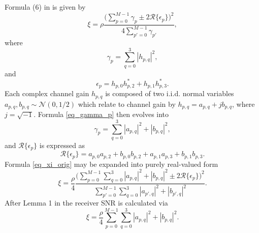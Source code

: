 \documentclass{article}
\begin{document}
Formula (6) in \cite{b_FullRate_STLC} is given by
\begin{equation} \label{eq_xi_orig}
    \xi = \rho \frac{\Big( \sum_{p=0}^{M-1} \gamma_{p} \pm 2\mathcal{R}\big\{ \epsilon_p\big\} \Big)^2}{4\sum_{p'=0}^{M-1}\gamma_{p'}},
\end{equation}
where 
\begin{equation} \label{eq_gamma_p}
    \gamma_p = \sum_{q=0}^{3} |h_{p,q}|^2,
\end{equation}
and
\begin{equation} \label{eq_epsilon_p}
    \epsilon_p = h_{p,0}h_{p,2}^* + h_{p,1}h_{p,3}^*.
\end{equation}
Each complex channel gain $h_{p,q}$ is composed of two i.i.d. normal variables $a_{p,q}, b_{p,q} \sim \mathcal{N}(0,1/2)$ which relate to channel gain by $h_{p,q} = a_{p,q} + jb_{p,q}$, where $j = \sqrt{-1}$.
Formula \eqref{eq_gamma_p} then evolves into
\begin{equation} \label{eq_gamma_p_2}
    \gamma_p = \sum_{q=0}^{3} |a_{p,q}|^2 + |b_{p,q}|^2,
\end{equation}
and $\mathcal{R}\big\{ \epsilon_p\big\}$ is expressed as
\begin{equation} \label{eq_epsilon_p_2}
    \mathcal{R}\big\{ \epsilon_p\big\} = a_{p,0}a_{p,2} + b_{p,0}b_{p,2} + a_{p,1}a_{p,3} + b_{p,1}b_{p,3}.
\end{equation}
Formula \eqref{eq_xi_orig} may be expanded into purely real-valued form
\begin{equation} \label{eq_xi_2}
    \xi = \frac{\rho}{4} \frac{\Big( \sum_{p=0}^{M-1} \sum_{q=0}^{3} |a_{p,q}|^2 + |b_{p,q}|^2 \pm 2\mathcal{R}\big\{ \epsilon_p\big\} \Big)^2}{ \sum_{p'=0}^{M-1} \sum_{q=0}^{3} |a_{p',q}|^2 + |b_{p',q}|^2}.
\end{equation}
After Lemma 1 in \cite{b_FullRate_STLC} the receiver SNR is calculated via
\begin{equation} \label{eq_xi_Lemma}
    \xi =  \frac{\rho}{4} \sum_{p=0}^{M-1} \sum_{q=0}^{3} |a_{p,q}|^2 + |b_{p,q}|^2 .
\end{equation}
\end{document}
